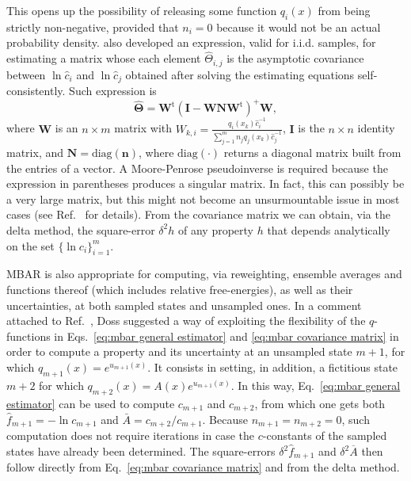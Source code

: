\documentclass[journal=jctcce,manuscript=article,layout=twocolumn]{achemso}
\newcommand{\mt}[1]{\boldsymbol{\mathbf{#1}}}   %
\newcommand{\vt}[1]{\boldsymbol{\mathbf{#1}}}   %
\newcommand{\tr}[1]{#1^\text{t}}                %
\newcommand{\avg}[1]{\overline{#1}}             %
\begin{document}
This opens up the possibility of releasing some function $q_i(x)$ from being strictly non-negative, provided that $n_i = 0$ because it would not be an actual probability density. \citeauthor{Kong_2003} \cite{Kong_2003} also developed an expression, valid for i.i.d. samples, for estimating a matrix whose each element $\hat \Theta_{i,j}$ is the asymptotic covariance between $\ln \hat c_i$ and $\ln \hat c_j$ obtained after solving the estimating equations self-consistently. Such expression is
\begin{equation}
\label{eq:mbar covariance matrix}
\hat{\mt \Theta} = \tr{\mt W} (\mt I - {\mt W}{\mt N}\tr{\mt W})^+  {\mt W},
\end{equation}
where $\mt W$ is an $n \times m$ matrix with $W_{k,i} = \frac{q_i(x_k) \hat c_i^{-1}}{\sum_{j=1}^m n_j q_j(x_k) \hat c_j^{-1}}$, $\mt I$ is the $n \times n$ identity matrix, and $\mt N = \text{diag}(\vt n)$, where $\text{diag}(\cdot)$ returns a diagonal matrix built from the entries of a vector. A Moore-Penrose pseudoinverse is required because the expression in parentheses produces a singular matrix. In fact, this can possibly be a very large matrix, but this might not become an unsurmountable issue in most cases (see Ref.~ for details). From the covariance matrix we can obtain, via the delta method, the square-error $\delta^2 h$ of any property $h$ that depends analytically on the set $\{\ln c_i\}_{i=1}^m$.

MBAR is also appropriate for computing, via reweighting, ensemble averages and functions thereof (which includes relative free-energies), as well as their uncertainties, at both sampled states and unsampled ones. In a comment attached to Ref.~, Doss suggested a way of exploiting the flexibility of the $q$-functions in Eqs.~\eqref{eq:mbar general estimator} and \eqref{eq:mbar covariance matrix} in order to compute a property and its uncertainty at an unsampled state $m+1$, for which $q_{m+1}(x) = e^{u_{m+1}(x)}$. It consists in setting, in addition, a fictitious state $m+2$ for which $q_{m+2}(x) = A(x)e^{u_{m+1}(x)}$. In this way, Eq.~\eqref{eq:mbar general estimator} can be used to compute $c_{m+1}$ and $c_{m+2}$, from which one gets both $\hat f_{m+1} = -\ln c_{m+1}$ and $\bar A = {c_{m+2}}/{c_{m+1}}$. Because $n_{m+1} = n_{m+2} = 0$, such computation does not require iterations in case the $c$-constants of the sampled states have already been determined. The square-errors $\delta^2 \hat f_{m+1}$ and $\delta^2 \avg A$ then follow directly from Eq.~\eqref{eq:mbar covariance matrix} and from the delta method.
\end{document}
